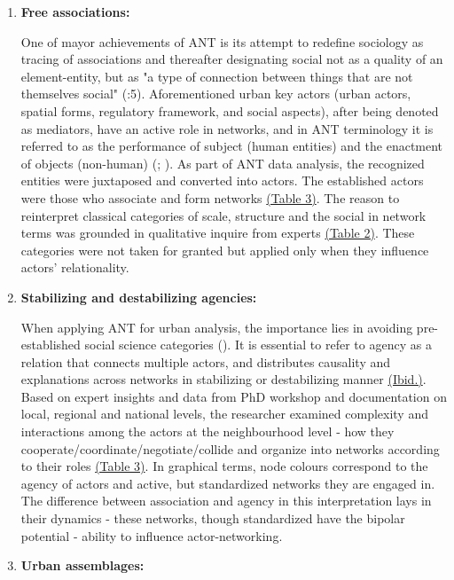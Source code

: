 \documentclass[11pt]{report}
\begin{document}
\begin{enumerate}
\item \textbf{Free associations:}

One of mayor achievements of ANT is its attempt to redefine sociology as tracing of associations and thereafter designating social not as a quality of an element-entity, but as "a type of connection between things that are not themselves social" (\cite{Latour 2005}:5).
Aforementioned urban key actors (urban actors, spatial forms, regulatory framework, and social aspects), after being denoted as mediators, have an active role in networks, and in ANT terminology it is referred to as the performance of subject (human entities) and the enactment of objects (non-human) (\cite{Farias 2011}; \cite{Callon 1986}). As part of ANT data analysis, the recognized entities were juxtaposed and converted into actors. The established actors were those who associate and form networks \href{ref}{(Table 3)}. The reason to reinterpret classical categories of scale, structure and the social in network terms was grounded in qualitative inquire from experts \href{ref}{(Table 2)}. These categories were not taken for granted but applied only when they influence actors’ relationality.

\item \textbf{Stabilizing and destabilizing agencies:}

When applying ANT for urban analysis, the importance lies in avoiding pre-established social science categories (\cite{Farias 2011}). It is essential to refer to agency as a relation that connects multiple actors, and distributes causality and explanations across networks in stabilizing or destabilizing manner \href{ref}{(Ibid.)}. 
Based on expert insights and data from PhD workshop and documentation on local, regional and national levels, the researcher examined complexity and interactions among the actors at the neighbourhood level - how they cooperate/coordinate/negotiate/collide and organize into networks according to their roles \href{ref}{(Table 3)}. In graphical terms, node colours correspond to the agency of actors and active, but standardized networks they are engaged in. The difference between association and agency in this interpretation lays in their dynamics - these networks, though standardized have the bipolar potential - ability to influence actor-networking.

\item \textbf{Urban assemblages:}


\end{enumerate}
\end{document}

